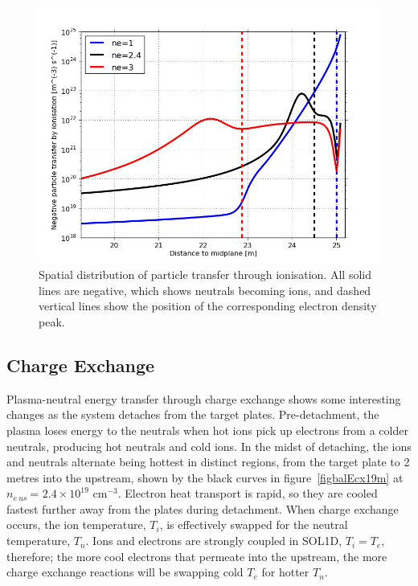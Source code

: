 \documentclass[12pt]{article}  %
\providecommand{\noNe}[1]{{${#1}\times 10^{19}$ cm$^{-3}$}} %
\providecommand{\neus}{$n_{e~us}~$} %
\begin{document}
\begin{figure}
\includegraphics[scale=0.5]{Figures/sol1d/balSizthick20m.png}
\centering
\caption{Spatial distribution of particle transfer through ionisation. All solid lines are negative, which shows neutrals becoming ions, and dashed vertical lines show the position of the corresponding electron density peak.}\label{figbalSizthick20m}
\end{figure}


\subsection{Charge Exchange}\label{ssecCX}
Plasma-neutral energy transfer through charge exchange shows some interesting changes as the system detaches from the target plates. Pre-detachment, the plasma loses energy to the neutrals when hot ions pick up electrons from a colder neutrals, producing hot neutrals and cold ions. In the midst of detaching, the ions and neutrals alternate being hottest in distinct regions, from the target plate to 2 metres into the upstream, shown by the black curves in figure~\ref{figbalEcx19m} at \neus = \noNe{2.4}. Electron heat transport is rapid, so they are cooled fastest further away from the plates during detachment. When charge exchange occurs, the ion temperature, $T_i$, is effectively swapped for the neutral temperature, $T_n$. Ions and electrons are strongly coupled in SOL1D, $T_i = T_e$, therefore; the more cool electrons that permeate into the upstream, the more charge exchange reactions will be swapping cold $T_e$ for hotter $T_n$.
\end{document}

